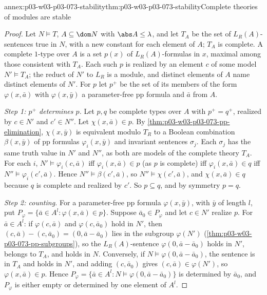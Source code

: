 \begin{annexitem}{annex:p03-w03-p03-073-stability}{thm:p03-w03-p03-073-stability}{Complete theories of modules are stable}
\begin{proof}
Let \(N\models T\), \(A\subseteq\dom N\) with \(\abs A\le\lambda\), and let
\(T_A\) be the set of \(L_R(A)\)-sentences true in \(N\), with a new
constant for each element of \(A\); \(T_A\) is complete. A complete
\(1\)-type over \(A\) is a set \(p(x)\) of \(L_R(A)\)-formulas in \(x\),
maximal among those consistent with \(T_A\). Each such \(p\) is realized by
an element \(c\) of some model \(N'\models T_A\); the reduct of \(N'\) to
\(L_R\) is a module, and distinct elements of \(A\) name distinct elements
of \(N'\). For \(p\) let \(p^+\) be the set of its members of the form
\(\varphi(x,\bar a)\) with \(\varphi(x,\bar y)\) a parameter-free pp formula
and \(\bar a\) from \(A\).

\emph{Step 1: \(p^+\) determines \(p\).} Let \(p,q\) be complete types over
\(A\) with \(p^+=q^+\), realized by \(c\in N'\) and \(c'\in N''\). Let
\(\chi(x,\bar a)\in p\). By \cref{thm:p03-w03-p03-073-pp-elimination},
\(\chi(x,\bar y)\) is equivalent modulo \(T_R\) to a Boolean combination
\(\beta(x,\bar y)\) of pp formulas \(\varphi_i(x,\bar y)\) and invariant
sentences \(\sigma_j\). Each \(\sigma_j\) has the same truth value in
\(N'\) and \(N''\), as both are models of the complete theory \(T_A\).
For each \(i\), \(N'\models\varphi_i(c,\bar a)\) iff
\(\varphi_i(x,\bar a)\in p\) (as \(p\) is complete) iff
\(\varphi_i(x,\bar a)\in q\) iff \(N''\models\varphi_i(c',\bar a)\). Hence
\(N''\models\beta(c',\bar a)\), so \(N''\models\chi(c',\bar a)\), and
\(\chi(x,\bar a)\in q\) because \(q\) is complete and realized by \(c'\).
So \(p\subseteq q\), and by symmetry \(p=q\).

\emph{Step 2: counting.} For a parameter-free pp formula
\(\varphi(x,\bar y)\), with \(\bar y\) of length \(l\), put
\(P_\varphi=\{\bar a\in A^l:\varphi(x,\bar a)\in p\}\). Suppose
\(\bar a_0\in P_\varphi\) and let \(c\in N'\) realize \(p\). For
\(\bar a\in A^l\): if \(\varphi(c,\bar a)\) and \(\varphi(c,\bar a_0)\)
hold in \(N'\), then \((c,\bar a)-(c,\bar a_0)=(0,\bar a-\bar a_0)\) lies
in the subgroup \(\varphi(N')\) (\cref{thm:p03-w03-p03-073-pp-subgroups}),
so the \(L_R(A)\)-sentence \(\varphi(0,\bar a-\bar a_0)\) holds in \(N'\),
belongs to \(T_A\), and holds in \(N\). Conversely, if
\(N\models\varphi(0,\bar a-\bar a_0)\), the sentence is in \(T_A\) and
holds in \(N'\), and adding \((c,\bar a_0)\) gives
\((c,\bar a)\in\varphi(N')\), so \(\varphi(x,\bar a)\in p\). Hence
\(P_\varphi=\{\bar a\in A^l:N\models\varphi(0,\bar a-\bar a_0)\}\) is
determined by \(\bar a_0\), and \(P_\varphi\) is either empty or determined
by one element of \(A^l\).


\end{proof}
\end{annexitem}
